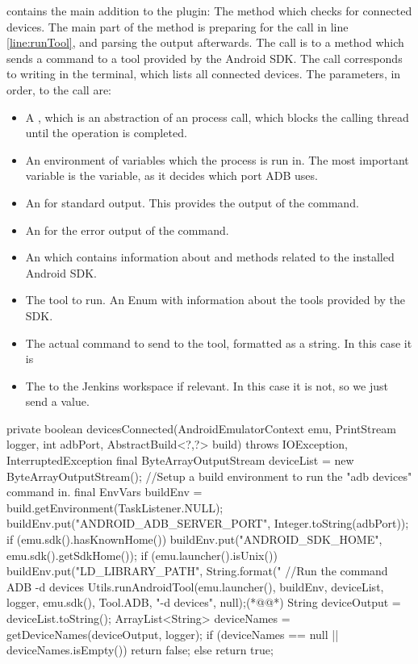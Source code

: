  contains the main addition to the plugin: The method which checks for connected devices. The main part of the method is preparing for the call in line \ref{line:runTool}, and parsing the output afterwards. The call is to a method which sends a command to a tool provided by the Android SDK. The call corresponds to writing  in the terminal, which lists all connected devices. The parameters, in order, to the call are:

\begin{itemize}
  \item A , which is an abstraction of an process call, which blocks the calling thread until the operation is completed.
  \item An environment of variables which the process is run in. The most important variable is the  variable, as it decides which port ADB uses.
  \item An  for standard output. This provides the output of the command.
  \item An  for the error output of the command.
  \item An  which contains information about and methods related to the installed Android SDK.
  \item The tool to run. An Enum with information about the tools provided by the SDK.
  \item The actual command to send to the tool, formatted as a string. In this case it is 
  \item The  to the Jenkins workspace if relevant. In this case it is not, so we just send a  value.
\end{itemize}

\begin{javacode}[float=tbp, caption=The devicesConnected method which checks for connected devices (written in Java),label=lst:deviceCheck]
private boolean devicesConnected(AndroidEmulatorContext emu, PrintStream logger, int adbPort, AbstractBuild<?,?> build)
throws IOException, InterruptedException {
    final ByteArrayOutputStream deviceList = new ByteArrayOutputStream();
    //Setup a build environment to run the "adb devices" command in.
    final EnvVars buildEnv = build.getEnvironment(TaskListener.NULL);
    buildEnv.put("ANDROID_ADB_SERVER_PORT", Integer.toString(adbPort));
    if (emu.sdk().hasKnownHome()) {
        buildEnv.put("ANDROID_SDK_HOME", emu.sdk().getSdkHome());
    }
    if (emu.launcher().isUnix()) {
        buildEnv.put("LD_LIBRARY_PATH", String.format("%
    }
    //Run the command ADB -d devices
    Utils.runAndroidTool(emu.launcher(), buildEnv, deviceList, logger, emu.sdk(), Tool.ADB, "-d devices", null);(*@\label{line:runTool}@*)
    String deviceOutput = deviceList.toString();
    ArrayList<String> deviceNames = getDeviceNames(deviceOutput, logger);
    if (deviceNames == null || deviceNames.isEmpty()) {
        return false;
    }
    else {
        return true;
    }
}
\end{javacode}

